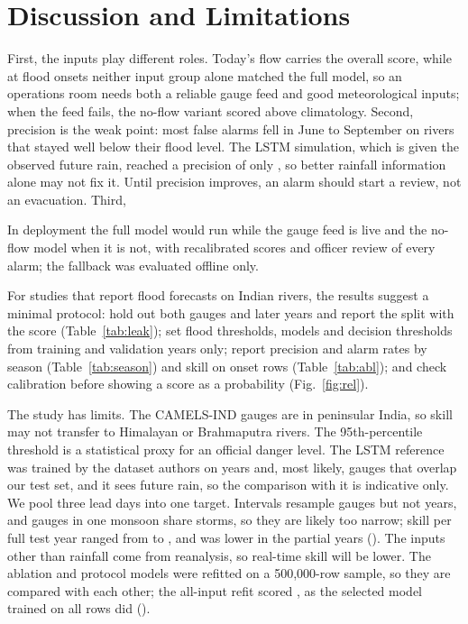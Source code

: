 \documentclass[conference]{IEEEtran}
\begin{document}
\section{Discussion and Limitations}
First, the inputs play different roles. Today's flow carries the overall score, while at flood onsets neither input group alone matched the full model, so an operations room needs both a reliable gauge feed and good meteorological inputs; when the feed fails, the no-flow variant scored above climatology. Second, precision is the weak point: most false alarms fell in June to September on rivers that stayed well below their flood level. The LSTM simulation, which is given the observed future rain, reached a precision of only \LstmPrec, so better rainfall information alone may not fix it. Until precision improves, an alarm should start a review, not an evacuation. Third, \LeakDiscuss{}


In deployment the full model would run while the gauge feed is live and the no-flow model when it is not, with recalibrated scores and officer review of every alarm; the fallback was evaluated offline only.

For studies that report flood forecasts on Indian rivers, the results suggest a minimal protocol: hold out both gauges and later years and report the split with the score (Table~\ref{tab:leak}); set flood thresholds, models and decision thresholds from training and validation years only; report precision and alarm rates by season (Table~\ref{tab:season}) and skill on onset rows (Table~\ref{tab:abl}); and check calibration before showing a score as a probability (Fig.~\ref{fig:rel}).

The study has limits. The CAMELS-IND gauges are in peninsular India, so skill may not transfer to Himalayan or Brahmaputra rivers. The 95th-percentile threshold is a statistical proxy for an official danger level. The LSTM reference was trained by the dataset authors on years and, most likely, gauges that overlap our test set, and it sees future rain, so the comparison with it is indicative only. We pool three lead days into one target. Intervals resample gauges but not years, and gauges in one monsoon share storms, so they are likely too narrow; skill per full test year ranged from \YearMinBA{} to \YearMaxBA, and was lower in the partial years \YearsSmall{} (\YearsSmallBA). The inputs other than rainfall come from reanalysis, so real-time skill will be lower. The ablation and protocol models were refitted on a 500,000-row sample, so they are compared with each other; the all-input refit scored \AblAllBA, as the selected model trained on all rows did (\XgbBA).
\end{document}
